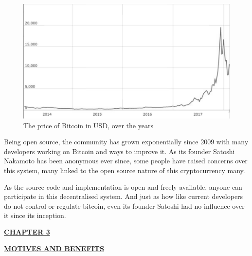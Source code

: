 \documentclass[12pt,a4paper]{report}
\begin{document}
\begin{justify}
\begin{figure}[h]
\centering
\caption{The price of Bitcoin in USD, over the years \cite{ThePrice}}
\includegraphics[scale=0.4]{pics/Price.JPG}
\end{figure}


Being open source, the community has grown exponentially since 2009 with many developers working on Bitcoin and ways to improve it. As its founder Satoshi Nakamoto has been anonymous ever since, some people have raised concerns over this system, many linked to the open source nature of this cryptocurrency many.

As the source code and implementation is open and freely available, anyone can participate in this decentralised system. And just as how like current developers do not control or regulate bitcoin, even its founder Satoshi had no influence over it since its inception.

\newpage
 
\begin{center}\underline{  \Large\textbf{CHAPTER 3}}\end{center}
\begin{center}\underline{ \Large \textbf{MOTIVES AND BENEFITS}}\end{center}


\end{justify}
\end{document}

